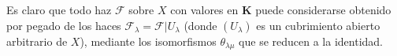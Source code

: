 \begin{env}[3.3.1]
Es claro que todo haz $\mathcal{F}$ sobre $X$ con valores en
$\boldsymbol{K}$ puede considerarse obtenido por pegado de los haces
$\mathcal{F}_\lambda=\mathcal{F}|U_\lambda$ (donde $(U_\lambda)$ es un
cubrimiento abierto arbitrario de $X$), mediante los isomorfismos
$\theta_{\lambda\mu}$ que se reducen a la identidad.
\end{env}
